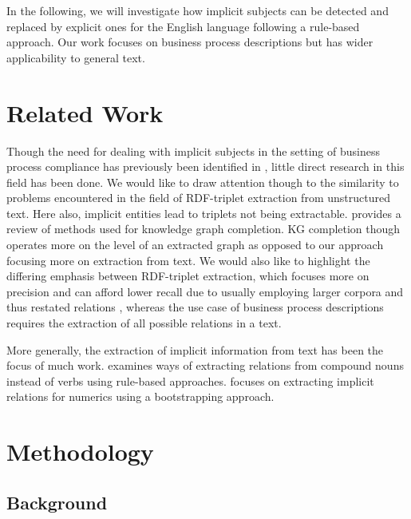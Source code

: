 \documentclass[times, 10pt,twocolumn]{article}
\begin{document}
In the following, we will investigate how implicit subjects can be detected and replaced
by explicit ones for the English language following a rule-based approach. Our work
focuses on business process descriptions but has wider applicability to general text.


\section{Related Work}
Though the need for dealing with implicit subjects in the setting of business process compliance
has previously been identified in \cite{sai_deviations_regulations}, little direct research in this
field has been done. We would like to draw attention though to the similarity to problems encountered
in the field of RDF-triplet extraction from unstructured text. Here also, implicit entities
lead to triplets not being extractable. \cite{kg_completion} provides a review of methods used
for knowledge graph completion. KG completion though operates more on the level of an extracted
graph as opposed to our approach focusing more on extraction from text. We would also like to
highlight the differing emphasis between RDF-triplet extraction, which focuses more on precision
and can afford lower recall due to usually employing larger corpora and thus restated relations
\cite{banko}, whereas the use case of business process descriptions requires the extraction of all
possible relations in a text.

More generally, the extraction of implicit information from text has been the focus of
much work. \cite{pal-mausam-2016-demonyms} examines ways of extracting relations from
compound nouns instead of verbs using rule-based approaches. \cite{saha-etal-2017-bootstrapping}
focuses on extracting implicit relations for numerics using a bootstrapping approach.






\section{Methodology}
\subsection{Background}\label{methodology:background}
\end{document}
